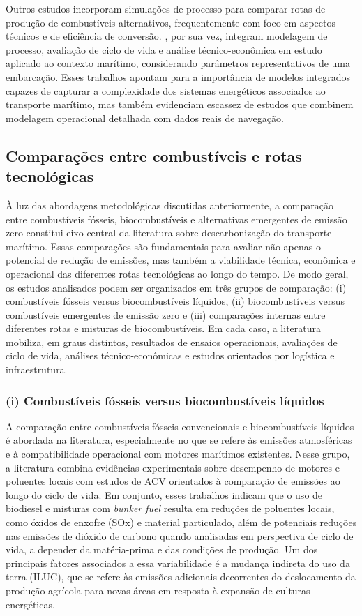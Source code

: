 Outros estudos incorporam simulações de processo para comparar rotas de produção de combustíveis alternativos, frequentemente com foco em aspectos técnicos e de eficiência de conversão. \citet{cesilla_de_souza_technical-economic_2024}, por sua vez, integram modelagem de processo, avaliação de ciclo de vida e análise técnico-econômica em estudo aplicado ao contexto marítimo, considerando parâmetros representativos de uma embarcação. Esses trabalhos apontam para a importância de modelos integrados capazes de capturar a complexidade dos sistemas energéticos associados ao transporte marítimo, mas também evidenciam escassez de estudos que combinem modelagem operacional detalhada com dados reais de navegação.

\subsection{Comparações entre combustíveis e rotas tecnológicas}
À luz das abordagens metodológicas discutidas anteriormente, a comparação entre combustíveis fósseis, biocombustíveis e alternativas emergentes de emissão zero constitui eixo central da literatura sobre descarbonização do transporte marítimo. Essas comparações são fundamentais para avaliar não apenas o potencial de redução de emissões, mas também a viabilidade técnica, econômica e operacional das diferentes rotas tecnológicas ao longo do tempo. De modo geral, os estudos analisados podem ser organizados em três grupos de comparação: (i) combustíveis fósseis versus biocombustíveis líquidos, (ii) biocombustíveis versus combustíveis emergentes de emissão zero e (iii) comparações internas entre diferentes rotas e misturas de biocombustíveis. Em cada caso, a literatura mobiliza, em graus distintos, resultados de ensaios operacionais, avaliações de ciclo de vida, análises técnico-econômicas e estudos orientados por logística e infraestrutura.

\subsubsection{(i) Combustíveis fósseis versus biocombustíveis líquidos}
A comparação entre combustíveis fósseis convencionais e biocombustíveis líquidos é abordada na literatura, especialmente no que se refere às emissões atmosféricas e à compatibilidade operacional com motores marítimos existentes. Nesse grupo, a literatura combina evidências experimentais sobre desempenho de motores e poluentes locais com estudos de \gls{ACV} orientados à comparação de emissões ao longo do ciclo de vida. Em conjunto, esses trabalhos indicam que o uso de biodiesel e misturas com \emph{bunker fuel} resulta em reduções de poluentes locais, como óxidos de enxofre (SOx) e material particulado, além de potenciais reduções nas emissões de dióxido de carbono quando analisadas em perspectiva de ciclo de vida, a depender da matéria-prima e das condições de produção. Um dos principais fatores associados a essa variabilidade é a mudança indireta do uso da terra (\gls{ILUC}), que se refere às emissões adicionais decorrentes do deslocamento da produção agrícola para novas áreas em resposta à expansão de culturas energéticas.

